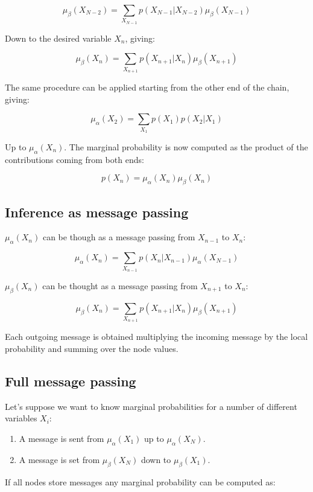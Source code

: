 	$$\mu_\beta(X_{N-2}) = \sum\limits_{X_{N-1}}p(X_{N-1}|X_{N-2})\mu_\beta(X_{N-1})$$

	Down to the desired variable $X_n$, giving:

	$$\mu_\beta(X_{n}) = \sum\limits_{X_{n+1}}p(X_{n+1}|X_{n})\mu_\beta(X_{n+1})$$

	The same procedure can be applied starting from the other end of the chain, giving:

	$$\mu_\alpha(X_2) = \sum\limits_{X_1}p(X_1)p(X_2|X_1)$$

	Up to $\mu_\alpha(X_n)$.
	The marginal probability is now computed as the product of the contributions coming from both ends:

	$$p(X_n) = \mu_\alpha(X_n)\mu_\beta(X_n)$$

	\subsection{Inference as message passing}
	$\mu_\alpha(X_n)$ can be though as a message passing from $X_{n-1}$ to $X_n$:

  $$\mu_\alpha(X_n) = \sum\limits_{X_{n-1}} p(X_n|X_{n-1})\mu_\alpha(X_{N-1})$$

	$\mu_\beta(X_n)$ can be thought as a message passing from $X_{n+1}$ to $X_n$:

	$$\mu_\beta(X_n) = \sum\limits_{X_{n+1}}p(X_{n+1}|X_n)\mu_\beta(X_{n+1})$$

	Each outgoing message is obtained multiplying the incoming message by the local probability and summing over the node values.

	\subsection{Full message passing}
	Let's suppose we want to know marginal probabilities for a number of different variables $X_i$:

	\begin{multicols}{2}
		\begin{enumerate}
			\item A message is sent from $\mu_\alpha(X_1)$ up to $\mu_\alpha(X_N)$.
			\item A message is set from $\mu_\beta(X_N)$ down to $\mu_\beta(X_1)$.
		\end{enumerate}
	\end{multicols}

	If all nodes store messages any marginal probability can be computed as:

